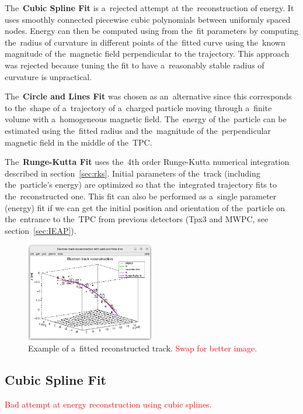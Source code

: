 \documentclass[]{article}
\begin{document}
	The~\textbf{Cubic Spline Fit} is a~rejected attempt at the~reconstruction of energy. It uses smoothly connected piecewise cubic polynomials between uniformly spaced nodes. Energy can then be computed using from the~fit parameters by computing the~radius of curvature in different points of the~fitted curve using the~known magnitude of the~magnetic field perpendicular to the trajectory. This approach was rejected because tuning the fit to have a~reasonably stable radius of curvature is unpractical.
	
	The~\textbf{Circle and Lines Fit} was chosen as an~alternative since this corresponds to the~shape of a~trajectory of a~charged particle moving through a~finite volume with a~homogeneous magnetic field. The~energy of the~particle can be estimated using the~fitted radius and the~magnitude of the~perpendicular magnetic field in the middle of the~TPC.
	
	The~\textbf{Runge-Kutta Fit} uses the~4th order Runge-Kutta numerical integration described in section~\ref{sec:rks}. Initial parameters of the~track (including the~particle's energy) are optimized so that the~integrated trajectory fits to the~reconstructed one. This fit can also be performed as a~single parameter (energy) fit if we can get the initial position and orientation of the~particle on the~entrance to the~TPC from previous detectors (Tpx3 and MWPC, see section~\ref{sec:IEAP}).
	
	\begin{figure}
		\centering
		\includegraphics[width=0.5\textwidth]{9010_3d.png}
		\caption{Example of a~fitted reconstructed track. \textcolor{red}{Swap for better image.}}
		\label{fig:90103d}
	\end{figure}
	
	\subsection{Cubic Spline Fit}
	\textcolor{red}{Bad attempt at energy reconstruction using cubic splines.}
	
\end{document}
